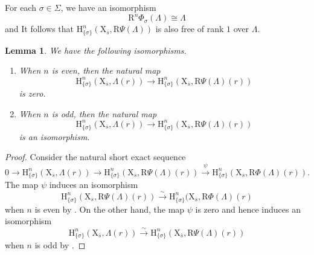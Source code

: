 \documentclass[10pt]{amsart}
\numberwithin{equation}{section}
\newtheorem{lemma}[equation]{Lemma}
\theoremstyle{definition}
\def\rmH{\mathrm{H}}
\def\rmR{\mathrm{R}}
\def\rmX{\mathrm{X}}
\begin{document}
For each $\sigma\in\Sigma$, we have an isomorphism
\begin{equation*}
\rmR^{n}\Phi_{\sigma}(\Lambda)\cong\Lambda
\end{equation*} and It follows that $\rmH^{n}_{\{\sigma\}}(\rmX_{\overline{s}}, \rmR\Psi(\Lambda))$ is also free of rank $1$ over $\Lambda$.

\begin{lemma}\label{co-van}
We have the following isomorphisms.
\begin{enumerate}
\item When $n$ is even, then the natural map 
\begin{equation*}
\rmH^{n}_{\{\sigma\}}(\rmX_{\overline{s}}, \Lambda(r))\rightarrow\rmH^{n}_{\{\sigma\}}(\rmX_{\overline{s}}, \rmR\Psi(\Lambda)(r))
\end{equation*}
is zero.
\item When $n$ is odd, then the natural map 
\begin{equation*}
\rmH^{n}_{\{\sigma\}}(\rmX_{\overline{s}}, \Lambda(r))\rightarrow \rmH^{n}_{\{\sigma\}}(\rmX_{\overline{s}}, \rmR\Psi(\Lambda)(r))
\end{equation*}
is an isomorphism.
\end{enumerate}
\end{lemma}
\begin{proof}
Consider the natural short exact sequence 
\begin{equation*}
0\rightarrow \rmH^{n}_{\{\sigma\}}(\rmX_{\overline{s}}, \Lambda(r))\rightarrow \rmH^{n}_{\{\sigma\}}(\rmX_{\overline{s}}, \rmR\Psi(\Lambda)(r))\xrightarrow{\psi} \rmH^{n}_{\{\sigma\}}(\rmX_{\overline{s}}, \rmR\Phi(\Lambda)(r)).
\end{equation*}
The map $\psi$ induces an isomorphism 
\begin{equation*}
\rmH^{n}_{\{\sigma\}}(\rmX_{\overline{s}}, \rmR\Psi(\Lambda)(r))\xrightarrow{\sim} \rmH^{n}_{\{\sigma\}}(\rmX_{\overline{s}}, \rmR\Phi(\Lambda)(r)
\end{equation*}
when $n$ is even by \cite[Expose XV 2.2 D]{SGA7}. On the other hand, the map $\psi$ is zero and hence induces an isomorphism
\begin{equation}
\rmH^{n}_{\{\sigma\}}(\rmX_{\overline{s}}, \Lambda(r))\xrightarrow{\sim} \rmH^{n}_{\{\sigma\}}(\rmX_{\overline{s}}, \rmR\Psi(\Lambda)(r)) 
\end{equation}
when $n$ is odd by \cite[Expose XV 2.2 E]{SGA7}.
\end{proof}
\end{document}
